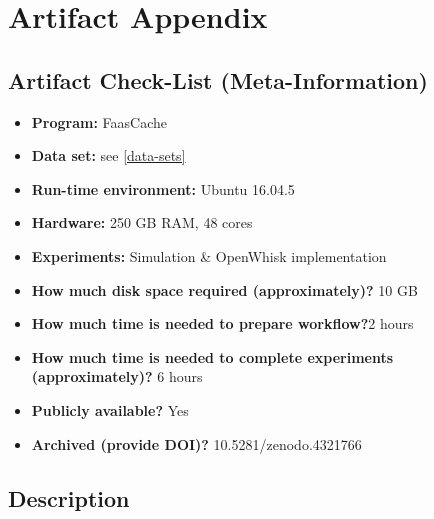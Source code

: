 %
%
%
%
%

\section{Artifact Appendix}
\label{sec:artifact-appendix}


\subsection{Artifact Check-List (Meta-Information)}

\begin{itemize}
  \item {\bf Program:} FaasCache
  \item {\bf Data set:}  see \ref{data-sets}
  \item {\bf Run-time environment:} Ubuntu 16.04.5
  \item {\bf Hardware:} 250 GB RAM, 48 cores
  \item {\bf Experiments:} Simulation \& OpenWhisk implementation
  \item {\bf How much disk space required (approximately)?} 10 GB
  \item {\bf How much time is needed to prepare workflow?}2 hours
  \item {\bf How much time is needed to complete experiments (approximately)?} 6 hours
  \item {\bf Publicly available?} Yes
  \item {\bf Archived (provide DOI)?} 10.5281/zenodo.4321766
\end{itemize}

\subsection{Description}

